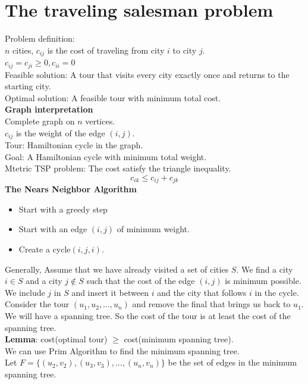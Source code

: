 \documentclass[onecolumn]{report}
\begin{document}
\section{The traveling salesman problem}
Problem definition:\\
\indent $n$ cities, $c_{ij}$ is the cost of traveling from city $i$ to city $j$.\\
\indent $c_{ij} = c_{ji} \geq 0,c_{ii} = 0$\\
Feasible solution: A tour that visits every city exactly once and returns to the starting city.\\
Optimal solution: A feasible tour with minimum total cost.\\
\textbf{Graph interpretation}\\
Complete graph on $n$ vertices.\\
\indent $c_{ij}$ is the weight of the edge $(i,j)$.\\
Tour: Hamiltonian cycle in the graph.\\
Goal: A Hamiltonian cycle with minimum total weight.\\
Mtetric TSP problem: The cost satisfy the triangle inequality.\\
\begin{equation*}
    c_{ik} \leq c_{ij} + c_{jk}
\end{equation*}
\textbf{The Nears Neighbor Algorithm}
\begin{itemize}
    \item Start with a greedy step
    \item Start with an edge $(i,j)$ of minimum weight.
    \item Create a cycle$(i,j,i)$.
\end{itemize}
Generally, Assume that we have already visited a set of cities $S$. We find a city $i \in S$ and a city $j \notin S$ such that the cost of the edge $(i,j)$ is minimum possible. We include $j$ in $S$ and insert it between $i$ and the city that follows $i$ in the cycle.\\
Consider the tour $(u_1,u_2,\dots,u_n)$ and remove the final that brings us back to $u_1$. We will have a spanning tree. So the cost of the tour is at least the cost of the spanning tree.\\
\textbf{Lemma}: cost(optimal tour) $\geq$ cost(minimum spanning tree).\\
We can use Prim Algorithm to find the minimum spanning tree.\\
Let $F=\{(u_2,v_2),(u_3,v_3),\dots,(u_{n},v_{n})\}$ be the set of edges in the minimum spanning tree.\\
\end{document}
